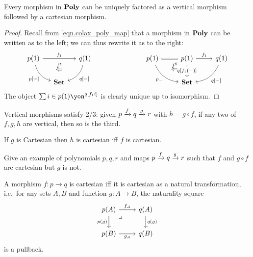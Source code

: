 \documentclass[Book-Poly]{subfiles}
\begin{document}
\begin{proposition}\label{prop.vert_cart_factorization}
Every morphism in $\textbf{Poly}$ can be uniquely factored as a vertical morphism followed by a cartesian morphism.
\end{proposition}
\begin{proof}
Recall from \cref{eqn.colax_poly_map} that a morphism in $\textbf{Poly}$ can be written as to the left; we can thus rewrite it as to the right:
\[
\begin{tikzcd}[column sep=small]
	p(\1)\ar[dr, bend right, "{p[-]}"']\ar[rr, "f_1"]&~&
	q(\1)\ar[dl, bend left, "{q[-]}"]\\&
	\smset\ar[u, phantom, near end, "\overset{f^\sharp}{\Leftarrow}"]
\end{tikzcd}
\hspace{1in}
\begin{tikzcd}
	p(\1)\ar[dr, bend right, "p_-"']\ar[r, equal, ""' name=equal]&
	p(\1)\ar[d, "{q[f_1(-)]}" description]\ar[r, "f_1"]&
	q(\1)\ar[dl, bend left, "{q[-]}"]\\&
	|[alias=set]|\smset\ar[from=equal, to=set, pos=.3, phantom, "\overset{f^\sharp}{\Leftarrow}"]
\end{tikzcd}
\]
The object $\sum{i\in p(\1)}\yon^{q[f_1i]}$ is clearly unique up to isomorphism.
\end{proof}

\begin{proposition}
Vertical morphisms satisfy 2/3: given $p\xrightarrow{f}q\xrightarrow{g}r$ with $h=g\circ f$, if any two of $f,g,h$ are vertical, then so is the third.

If $g$ is Cartesian then $h$ is cartesian iff $f$ is cartesian.
\end{proposition}

\begin{exercise}
Give an example of polynomials $p,q,r$ and maps $p\xrightarrow{f}q\xrightarrow{g}r$ such that $f$ and $g\circ f$ are cartesian but $g$ is not.
\end{exercise}

\begin{proposition}\label{prop.cart_as_nt}
A morphism $f\colon p\to q$ is cartesian iff it is cartesian as a natural transformation, i.e.\ for any sets $A,B$ and function $g\colon A\to B$, the naturality square
\[
\begin{tikzcd}
	p(A)\ar[r, "f_A"]\ar[d, "p(g)"']&
	q(A)\ar[d, "q(g)"]\\
	p(B)\ar[r, "g_A"']&
	q(B)\ar[ul, phantom, very near end, "\lrcorner"]
\end{tikzcd}
\]
is a pullback.
\end{proposition}
\end{document}
